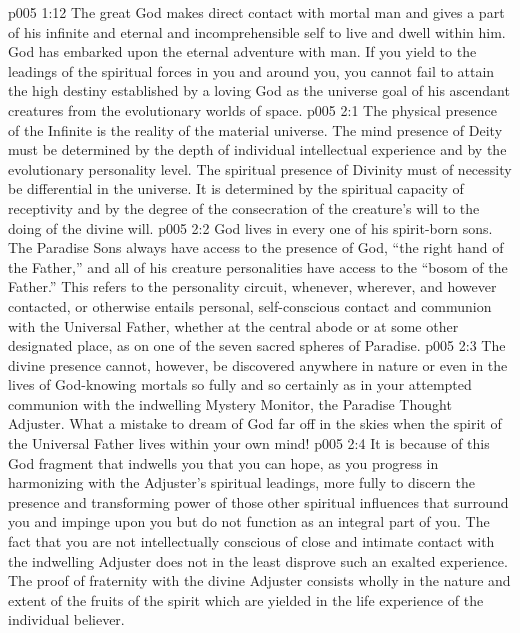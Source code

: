 \vs p005 1:12 The great God makes direct contact with mortal man and gives a part of his infinite and eternal and incomprehensible self to live and dwell within him. God has embarked upon the eternal adventure with man. If you yield to the leadings of the spiritual forces in you and around you, you cannot fail to attain the high destiny established by a loving God as the universe goal of his ascendant creatures from the evolutionary worlds of space.
\vs p005 2:1 The physical presence of the Infinite is the reality of the material universe. The mind presence of Deity must be determined by the depth of individual intellectual experience and by the evolutionary personality level. The spiritual presence of Divinity must of necessity be differential in the universe. It is determined by the spiritual capacity of receptivity and by the degree of the consecration of the creature’s will to the doing of the divine will.
\vs p005 2:2 God lives in every one of his spirit\hyp{}born sons. The Paradise Sons always have access to the presence of God, “the right hand of the Father,” and all of his creature personalities have access to the “bosom of the Father.” This refers to the personality circuit, whenever, wherever, and however contacted, or otherwise entails personal, self\hyp{}conscious contact and communion with the Universal Father, whether at the central abode or at some other designated place, as on one of the seven sacred spheres of Paradise.
\vs p005 2:3 The divine presence cannot, however, be discovered anywhere in nature or even in the lives of God\hyp{}knowing mortals so fully and so certainly as in your attempted communion with the indwelling Mystery Monitor, the Paradise Thought Adjuster. What a mistake to dream of God far off in the skies when the spirit of the Universal Father lives within your own mind!
\vs p005 2:4 \pc It is because of this God fragment that indwells you that you can hope, as you progress in harmonizing with the Adjuster’s spiritual leadings, more fully to discern the presence and transforming power of those other spiritual influences that surround you and impinge upon you but do not function as an integral part of you. The fact that you are not intellectually conscious of close and intimate contact with the indwelling Adjuster does not in the least disprove such an exalted experience. The proof of fraternity with the divine Adjuster consists wholly in the nature and extent of the fruits of the spirit which are yielded in the life experience of the individual believer. 
